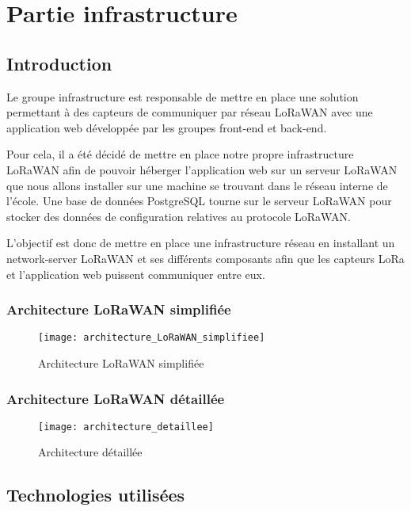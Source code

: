 \chapter{Partie infrastructure}

\section{Introduction}

Le groupe infrastructure est responsable de mettre en place une solution permettant à des capteurs de communiquer par réseau LoRaWAN avec une application web développée par les groupes front-end et back-end.

Pour cela, il a été décidé de mettre en place notre propre infrastructure LoRaWAN afin de pouvoir héberger l'application web sur un serveur LoRaWAN que nous allons installer sur une machine se trouvant dans le réseau interne de l'école. Une base de données PostgreSQL tourne sur le serveur LoRaWAN pour stocker des données de configuration relatives au protocole LoRaWAN.

L'objectif est donc de mettre en place une infrastructure réseau en installant un network-server LoRaWAN et ses différents composants afin que les capteurs LoRa et l'application web puissent communiquer entre eux.

\subsection{Architecture LoRaWAN simplifiée}

\begin{figure}[h!]
\texttt{[image: architecture\_LoRaWAN\_simplifiee]}
\caption{Architecture LoRaWAN simplifiée}
\end{figure}

\clearpage
\subsection{Architecture LoRaWAN détaillée}

\begin{figure}[h!]
\texttt{[image: architecture\_detaillee]}
\caption{Architecture détaillée}
\end{figure}
\clearpage

\section{Technologies utilisées}

